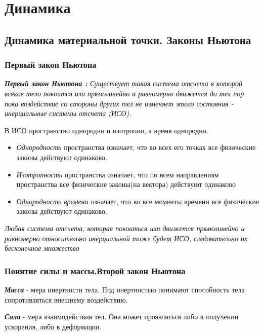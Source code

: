 \documentclass[../main.tex]{subfiles}
\begin{document}
\chapter{Динамика}

\section{Динамика материальной точки. Законы Ньютона}
\subsection{Первый закон Ньютона}
\textit{\textbf{Первый закон Ньютона :} Существует такая система отсчета в которой всякое тело покоится или прямолинейно и равномерно движется до тех пор пока воздействие со стороны других тел не изменяет этого состояния - инерциальные системы отсчета (ИСО).}

\vspace{5px}

В ИСО пространство однородно и изотропно, а время однородно.
\begin{itemize}
    \item \textit{Однородность} пространства означает, что во всех его точках все физические законы действуют одинаково.
    \item \textit{Изотропность} пространства означает, что по всем направлениям пространства все физические законы(на вектора) действуют одинаково
    \item О\textit{днородность времени} означает, что во все моменты времени все физические законы действуют одинаково.
\end{itemize}
\textit{Любая система отсчета, которая покоиться или движется прямолинейно и равномерно относительно инерциальной тоже будет ИСО, следовательно их бесконечное множество}
\subsection{Понятие силы и массы.Второй закон Ньютона}

  \textbf{\textit{Масса}} - мера инертности тела. Под инертностью понимают способность тела сопротивляться внешнему воздействию.

\vspace{5px}

  \textbf{\textit{Сила}} - мера взаимодействия тел. Она может проявляться либо в получении ускорения, либо в деформации.
\end{document}

